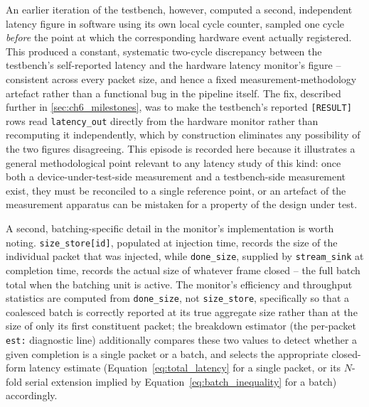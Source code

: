 An earlier iteration of the testbench, however, computed a second, independent latency figure in software using its own local cycle counter, sampled one cycle \emph{before} the point at which the corresponding hardware event actually registered. This produced a constant, systematic two-cycle discrepancy between the testbench's self-reported latency and the hardware latency monitor's figure -- consistent across every packet size, and hence a fixed measurement-methodology artefact rather than a functional bug in the pipeline itself. The fix, described further in \autoref{sec:ch6_milestones}, was to make the testbench's reported \texttt{[RESULT]} rows read \texttt{latency\_out} directly from the hardware monitor rather than recomputing it independently, which by construction eliminates any possibility of the two figures disagreeing. This episode is recorded here because it illustrates a general methodological point relevant to any latency study of this kind: once both a device-under-test-side measurement and a testbench-side measurement exist, they must be reconciled to a single reference point, or an artefact of the measurement apparatus can be mistaken for a property of the design under test.

A second, batching-specific detail in the monitor's implementation is worth noting. \texttt{size\_store[id]}, populated at injection time, records the size of the individual packet that was injected, while \texttt{done\_size}, supplied by \texttt{stream\_sink} at completion time, records the actual size of whatever frame closed -- the full batch total when the batching unit is active. The monitor's efficiency and throughput statistics are computed from \texttt{done\_size}, not \texttt{size\_store}, specifically so that a coalesced batch is correctly reported at its true aggregate size rather than at the size of only its first constituent packet; the breakdown estimator (the per-packet \texttt{est:} diagnostic line) additionally compares these two values to detect whether a given completion is a single packet or a batch, and selects the appropriate closed-form latency estimate (Equation~\ref{eq:total_latency} for a single packet, or its $N$-fold serial extension implied by Equation~\ref{eq:batch_inequality} for a batch) accordingly.
